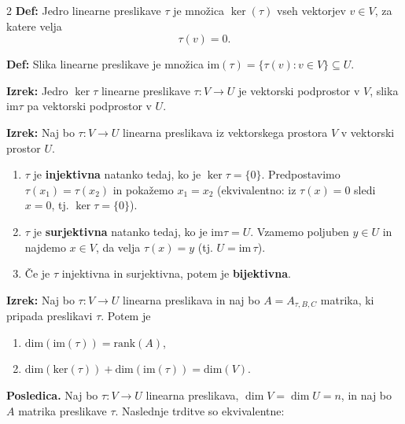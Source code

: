 \documentclass{article}
\begin{document}
\begin{multicols}{2}
	\textbf{Def:} Jedro linearne preslikave \( \tau \) je množica \( \ker(\tau) \) vseh vektorjev \( v \in V \), za katere velja
	\[ \tau(v) = 0. \]

	\textbf{Def:} Slika linearne preslikave je množica \( \text{im}(\tau) = \{ \tau(v) : v \in V \} \subseteq U \).

	\textbf{Izrek:} Jedro \( \ker \tau \) linearne preslikave \( \tau: V \rightarrow U \) je vektorski podprostor v \( V \), slika \( \text{im} \tau \) pa vektorski podprostor v \( U \).

	\textbf{Izrek:} Naj bo \( \tau: V \rightarrow U \) linearna preslikava iz vektorskega prostora \( V \) v vektorski prostor \( U \).
	\begin{enumerate}
		\item \( \tau \) je \textbf{injektivna} natanko tedaj, ko je \( \ker \tau = \{0\} \).
		      Predpostavimo \( \tau(x_1)=\tau(x_2) \) in pokažemo \( x_1=x_2 \) (ekvivalentno: iz \( \tau(x)=0 \) sledi \( x=0 \), tj. \( \ker\tau=\{0\} \)).
		\item \( \tau \) je \textbf{surjektivna} natanko tedaj, ko je \( \text{im} \tau = U \).
		      Vzamemo poljuben \( y\in U \) in najdemo \( x\in V \), da velja \( \tau(x)=y \) (tj. \( U=\mathrm{im}\,\tau \)).
		\item Če je \( \tau \) injektivna in surjektivna, potem je \textbf{bijektivna}.
	\end{enumerate}

	\textbf{Izrek:} Naj bo \( \tau: V \rightarrow U \) linearna preslikava in naj bo \( A = A_{\tau,B,C} \) matrika, ki pripada preslikavi \( \tau \). Potem je
	\begin{enumerate}
		\item \( \text{dim}(\text{im}(\tau)) = \text{rank}(A) \),
		\item \( \text{dim}(\text{ker}(\tau)) + \text{dim}(\text{im}(\tau)) = \text{dim}(V) \).
	\end{enumerate}


	\textbf{Posledica.}
	Naj bo \(\tau:V\to U\) linearna preslikava, \(\dim V=\dim U=n\), in naj bo \(A\) matrika preslikave \(\tau\).
	Naslednje trditve so ekvivalentne:


\end{multicols}
\end{document}

